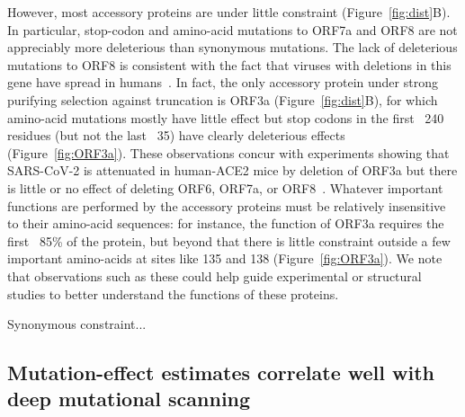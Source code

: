 \documentclass[9pt,twocolumn,twoside]{gsajnl_modified}
\begin{document}
However, most accessory proteins are under little constraint (Figure~\ref{fig:dist}B).
In particular, stop-codon and amino-acid mutations to ORF7a and ORF8 are not appreciably more deleterious than synonymous mutations.
The lack of deleterious mutations to ORF8 is consistent with the fact that viruses with deletions in this gene have spread in humans~\cite{su2020discovery}.
In fact, the only accessory protein under strong purifying selection against truncation is ORF3a (Figure~\ref{fig:dist}B), for which amino-acid mutations mostly have little effect but stop codons in the first ~240 residues (but not the last ~35) have clearly deleterious effects (Figure~\ref{fig:ORF3a}).
These observations concur with experiments showing that SARS-CoV-2 is attenuated in human-ACE2 mice by deletion of ORF3a but there is little or no effect of deleting ORF6, ORF7a, or ORF8~\citep{mcgrath2022sars,silvas2021contribution,liu2022live}.
Whatever important functions are performed by the accessory proteins must be relatively insensitive to their amino-acid sequences: for instance, the function of ORF3a requires the first ~85\% of the protein, but beyond that there is little constraint outside a few important amino-acids at sites like 135 and 138 (Figure~\ref{fig:ORF3a}).
We note that observations such as these could help guide experimental or structural studies to better understand the functions of these proteins.

Synonymous constraint...

\subsection*{Mutation-effect estimates correlate well with deep mutational scanning}
\end{document}
